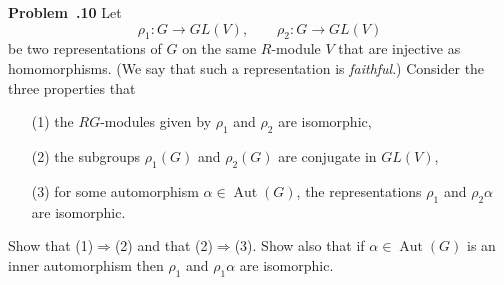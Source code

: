 \documentclass[12pt]{article}
\DeclareMathOperator{\Aut}{Aut}
\newenvironment{prob}[1]{\par\smallskip
	\noindent\begin{mdframed}\small \textbf{Problem~\thesection.#1} \rmfamily\quad}{\end{mdframed}\medskip}
\begin{document}
\begin{prob}{10}
	Let
	\[\rho_1:G\to GL(V),\qquad\rho_2:G\to GL(V)\]
	be two representations of $G$ on the same $R$-module $V$ that are injective as homomorphisms. (We say that such a representation is \textit{faithful}.) Consider the three properties that
	\begin{itemize}
		\item[(1)] the $RG$-modules given by $\rho_1$ and $\rho_2$ are isomorphic,
		\item[(2)] the subgroups $\rho_1(G)$ and $\rho_2(G)$ are conjugate in $GL(V)$,
		\item[(3)] for some automorphism $\alpha\in\Aut(G)$, the  representations $\rho_1$ and $\rho_2\alpha$ are isomorphic.
	\end{itemize}
	Show that (1)$\Rightarrow$(2) and that (2)$\Rightarrow$(3). Show also that if $\alpha\in\Aut(G)$ is an inner automorphism then $\rho_1$ and $\rho_1\alpha$ are isomorphic.
\end{prob}
\end{document}
